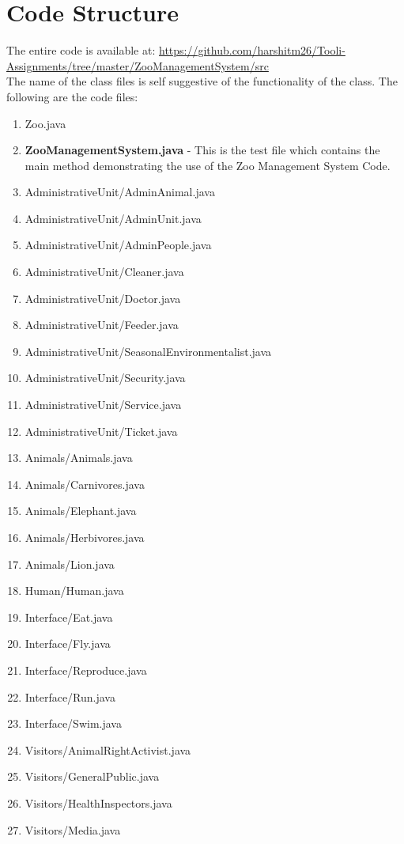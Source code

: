 \documentclass[paper=a4, fontsize=11pt]{scrartcl} %
\numberwithin{equation}{section} %
\numberwithin{figure}{section} %
\numberwithin{table}{section} %
\begin{document}
\section{Code Structure \label{CodeStructre}}
The entire code is available at: 
\url{https://github.com/harshitm26/Tooli-Assignments/tree/master/ZooManagementSystem/src}\\
The name of the class files is self suggestive of the functionality of the class. The following are the code files: 
\begin{enumerate}
	\item Zoo.java
	\item \textbf{ZooManagementSystem.java} - 	This is the test file which contains the main method demonstrating the use of the Zoo Management System Code. 
	\item AdministrativeUnit/AdminAnimal.java
	\item AdministrativeUnit/AdminUnit.java
	\item AdministrativeUnit/AdminPeople.java
	\item AdministrativeUnit/Cleaner.java
	\item AdministrativeUnit/Doctor.java
	\item AdministrativeUnit/Feeder.java
	\item AdministrativeUnit/SeasonalEnvironmentalist.java
	\item AdministrativeUnit/Security.java
	\item AdministrativeUnit/Service.java
	\item AdministrativeUnit/Ticket.java
	\item Animals/Animals.java
	\item Animals/Carnivores.java
	\item Animals/Elephant.java
	\item Animals/Herbivores.java
	\item Animals/Lion.java
	\item Human/Human.java
	\item Interface/Eat.java
	\item Interface/Fly.java
	\item Interface/Reproduce.java
	\item Interface/Run.java
	\item Interface/Swim.java
	\item Visitors/AnimalRightActivist.java
	\item Visitors/GeneralPublic.java
	\item Visitors/HealthInspectors.java
	\item Visitors/Media.java

\end{enumerate}
\end{document}
